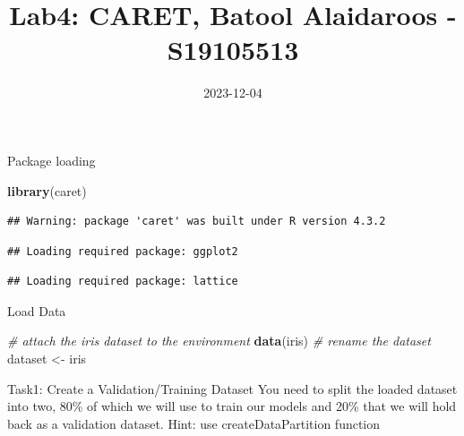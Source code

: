 \documentclass[
]{article}
\title{Lab4: CARET, Batool Alaidaroos - S19105513}
\author{}
\date{\vspace{-2.5em}2023-12-04}
\newenvironment{Shaded}{\begin{snugshade}}{\end{snugshade}}
\newcommand{\AttributeTok}[1]{\textcolor[rgb]{0.13,0.29,0.53}{#1}}
\newcommand{\CommentTok}[1]{\textcolor[rgb]{0.56,0.35,0.01}{\textit{#1}}}
\newcommand{\ConstantTok}[1]{\textcolor[rgb]{0.56,0.35,0.01}{#1}}
\newcommand{\DecValTok}[1]{\textcolor[rgb]{0.00,0.00,0.81}{#1}}
\newcommand{\FloatTok}[1]{\textcolor[rgb]{0.00,0.00,0.81}{#1}}
\newcommand{\FunctionTok}[1]{\textcolor[rgb]{0.13,0.29,0.53}{\textbf{#1}}}
\newcommand{\NormalTok}[1]{#1}
\newcommand{\OtherTok}[1]{\textcolor[rgb]{0.56,0.35,0.01}{#1}}
\newcommand{\SpecialCharTok}[1]{\textcolor[rgb]{0.81,0.36,0.00}{\textbf{#1}}}
\begin{document}
\maketitle

Package loading

\begin{Shaded}
\begin{Highlighting}[]
\FunctionTok{library}\NormalTok{(caret)}
\end{Highlighting}
\end{Shaded}

\begin{verbatim}
## Warning: package 'caret' was built under R version 4.3.2
\end{verbatim}

\begin{verbatim}
## Loading required package: ggplot2
\end{verbatim}

\begin{verbatim}
## Loading required package: lattice
\end{verbatim}

Load Data

\begin{Shaded}
\begin{Highlighting}[]
\CommentTok{\# attach the iris dataset to the environment}
\FunctionTok{data}\NormalTok{(iris)}
\CommentTok{\# rename the dataset}
\NormalTok{dataset }\OtherTok{\textless{}{-}}\NormalTok{ iris}
\end{Highlighting}
\end{Shaded}

Task1: Create a Validation/Training Dataset You need to split the loaded
dataset into two, 80\% of which we will use to train our models and 20\%
that we will hold back as a validation dataset. Hint: use
createDataPartition function

\begin{Shaded}
\end{Shaded}
\end{document}
